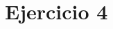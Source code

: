 \documentclass[../../labo_tp5_main.tex]{subfiles}
\begin{document}
\section{Ejercicio 4}
\end{document}
